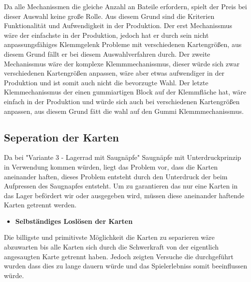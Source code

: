 Da alle Mechanissmen die gleiche Anzahl an Bateile erfordern, spielt der Preis bei dieser Auswahl keine große Rolle. Aus diesem Grund
sind die Kriterien Funktionalität und Aufwendigkeit in der Produktion. Der erst Mechanissmus wäre der einfachste in der Produktion, jedoch
hat er durch sein nicht anpassungsfähiges Klemmgelenk Probleme mit verschiedenen Kartengrößen, aus diesem Grund fällt er bei diesem Auswahlverfahren durch.
Der zweite Mechanissmus wäre der komplexe Klemmmechanissmus, dieser würde sich zwar verschiedenen Kartengrößen anpassen, wäre aber etwas aufwendiger in der
Produktion und ist somit auch nicht die bevorzugte Wahl. Der letzte Klemmechanissmus der einen gummiartigen Block auf der Klemmfläche hat, wäre einfach in der
Produktion und würde sich auch bei verschiedenen Kartengrößen anpassen, aus diesem Grund  fätt die wahl auf den Gummi Klemmmechanissmus.

\subsection{Seperation der Karten}
Da bei "Variante 3 - Lagerrad mit Saugnäpfe" Saugnäpfe mit Unterdruckprinzip in Verwendung kommen würden, liegt das Problem vor,
dass die Karten aneinander haften, dieses Problem entsteht durch den Unterdruck der beim Aufpressen des Saugnapfes entsteht.
Um zu garantieren das nur eine Karten in das Lager befördert wir oder ausgegeben wird, müssen diese aneinander
haftende Karten getrennt werden.

\begin{itemize}
    \item \textbf{Selbständiges Loslösen der Karten}
\end{itemize}

Die billigste und primitivste Möglichkeit die Karten zu separieren wäre abzuwarten bis alle Karten sich durch die Schwerkraft
von der eigentlich angesaugten Karte getrennt haben. Jedoch zeigten Versuche die durchgeführt wurden dass dies zu lange
dauern würde und das Spielerlebniss somit beeinflussen würde.

